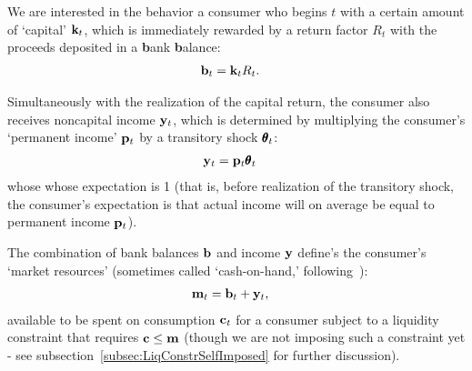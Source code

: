 \documentclass[titlepage, headings=optiontotocandhead]{econtex}
\begin{document}
We are interested in the behavior a consumer who begins {\interval} $t$ with a certain amount of `capital' $\mathbf{k}_{t}$, which is immediately rewarded by a return factor $R_{t}$  with the proceeds deposited in a \textbf{b}ank \textbf{b}alance:
\begin{equation}\begin{gathered}\begin{aligned}\label{eq:bLvl}
      \mathbf{b}_{t} & = \mathbf{k}_{t}R_{t}. 
    \end{aligned}\end{gathered}\end{equation}

Simultaneously with the realization of the capital return, the consumer also receives noncapital income $\mathbf{y}_{t}$, which is determined by multiplying the consumer's `permanent income' $\mathbf{p}_{t}$ by a transitory shock $\pmb{\theta}_{t}$:
\begin{equation}\begin{gathered}\begin{aligned}
      \mathbf{y}_{t} & = \mathbf{p}_{t}\pmb{\theta}_{t} \label{eq:yLvl}
    \end{aligned}\end{gathered}\end{equation}
whose whose expectation is 1 (that is, before realization of the transitory shock, the consumer's expectation is that actual income will on average be equal to permanent income $\mathbf{p}_{t}$).

The combination of bank balances $\mathbf{b}$ and income $\mathbf{y}$ define's the consumer's `market resources' (sometimes called `cash-on-hand,' following~\cite{deatonUnderstandingC}):
\begin{equation}\begin{gathered}\begin{aligned}
      \mathbf{m}_{t} & = \mathbf{b}_{t}+\mathbf{y}_{t} \label{eq:mLvl},
    \end{aligned}\end{gathered}\end{equation}
available to be spent on consumption $\mathbf{c}_{t}$ for a consumer subject to a liquidity constraint that requires $\mathbf{c} \leq \mathbf{m}$ (though we are not imposing such a constraint yet - see subsection~\ref{subsec:LiqConstrSelfImposed} for further discussion).
\end{document}
